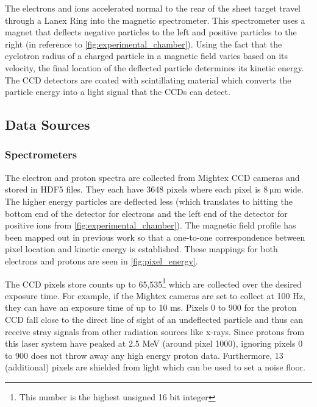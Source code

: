 The electrons and ions accelerated normal to the rear of the sheet target travel through a Lanex Ring into the magnetic spectrometer. This spectrometer uses a magnet that deflects negative particles to the left and positive particles to the right (in reference to \autoref{fig:experimental_chamber}). Using the fact that the cyclotron radius of a charged particle in a magnetic field varies based on its velocity, the final location of the deflected particle determines its kinetic energy. The \gls{CCD} detectors are coated with scintillating material which converts the particle energy into a light signal that the \gls{CCD}s can detect.  

\subsection{Data Sources} \label{sec:data_sources}
\subsubsection{Spectrometers}

The electron and proton spectra are collected from Mightex \gls{CCD} cameras and stored in \gls{HDF5} files. They each have 3648 pixels where each pixel is $\SI{8}{\micro \meter}$ wide. The higher energy particles are deflected less (which translates to hitting the bottom end of the detector for electrons and the left end of the detector for positive ions from \autoref{fig:experimental_chamber}). The magnetic field profile has been mapped out in previous work \cite{Morrison_2018_NJoP} so that a one-to-one correspondence between pixel location and kinetic energy is established. These mappings for both electrons and protons are seen in \autoref{fig:pixel_energy}. 

The CCD pixels store counts up to 65,535\footnote{This number is the highest unsigned 16 bit integer} which are collected over the desired exposure time. For example, if the Mightex cameras are set to collect at 100 Hz, they can have an exposure time of up to 10 ms. Pixels 0 to 900 for the proton CCD fall close to the direct line of sight of an undeflected particle and thus can receive stray signals from other radiation sources like x-rays. Since protons from this laser system have peaked at 2.5 MeV \cite{Morrison_2018_NJoP} (around pixel 1000), ignoring pixels 0 to 900 does not throw away any high energy proton data. Furthermore, 13 (additional) pixels are shielded from light which can be used to set a noise floor.

